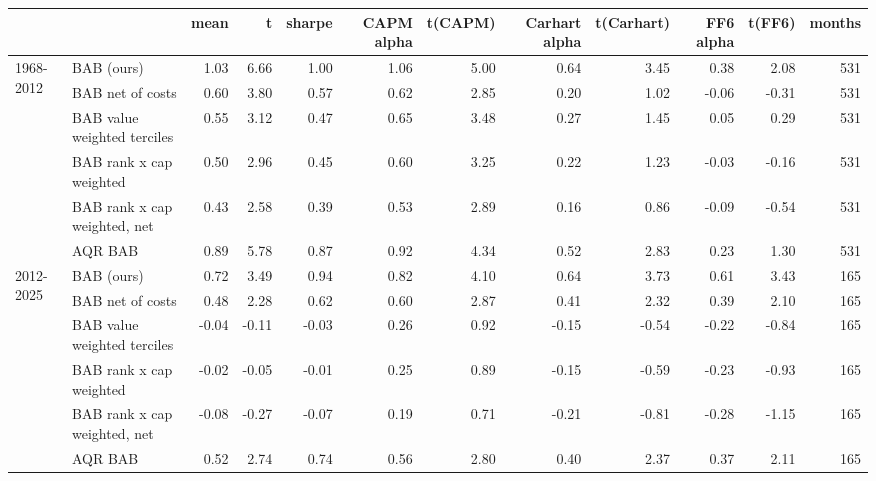 \begin{tabular}{llrrrrrrrrrr}
\toprule
 &  & mean & t & sharpe & CAPM alpha & t(CAPM) & Carhart alpha & t(Carhart) & FF6 alpha & t(FF6) & months \\
\midrule
\multirow[t]{6}{*}{1968-2012} & BAB (ours) & 1.03 & 6.66 & 1.00 & 1.06 & 5.00 & 0.64 & 3.45 & 0.38 & 2.08 & 531 \\
 & BAB net of costs & 0.60 & 3.80 & 0.57 & 0.62 & 2.85 & 0.20 & 1.02 & -0.06 & -0.31 & 531 \\
 & BAB value weighted terciles & 0.55 & 3.12 & 0.47 & 0.65 & 3.48 & 0.27 & 1.45 & 0.05 & 0.29 & 531 \\
 & BAB rank x cap weighted & 0.50 & 2.96 & 0.45 & 0.60 & 3.25 & 0.22 & 1.23 & -0.03 & -0.16 & 531 \\
 & BAB rank x cap weighted, net & 0.43 & 2.58 & 0.39 & 0.53 & 2.89 & 0.16 & 0.86 & -0.09 & -0.54 & 531 \\
 & AQR BAB & 0.89 & 5.78 & 0.87 & 0.92 & 4.34 & 0.52 & 2.83 & 0.23 & 1.30 & 531 \\
\cline{1-12}
\multirow[t]{6}{*}{2012-2025} & BAB (ours) & 0.72 & 3.49 & 0.94 & 0.82 & 4.10 & 0.64 & 3.73 & 0.61 & 3.43 & 165 \\
 & BAB net of costs & 0.48 & 2.28 & 0.62 & 0.60 & 2.87 & 0.41 & 2.32 & 0.39 & 2.10 & 165 \\
 & BAB value weighted terciles & -0.04 & -0.11 & -0.03 & 0.26 & 0.92 & -0.15 & -0.54 & -0.22 & -0.84 & 165 \\
 & BAB rank x cap weighted & -0.02 & -0.05 & -0.01 & 0.25 & 0.89 & -0.15 & -0.59 & -0.23 & -0.93 & 165 \\
 & BAB rank x cap weighted, net & -0.08 & -0.27 & -0.07 & 0.19 & 0.71 & -0.21 & -0.81 & -0.28 & -1.15 & 165 \\
 & AQR BAB & 0.52 & 2.74 & 0.74 & 0.56 & 2.80 & 0.40 & 2.37 & 0.37 & 2.11 & 165 \\
\cline{1-12}
\bottomrule
\end{tabular}
